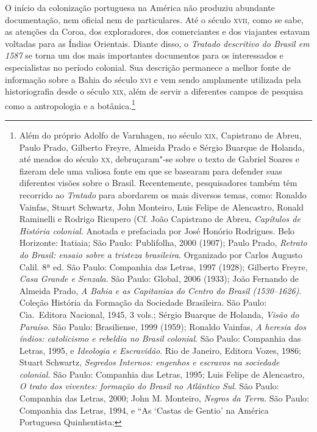 O início da colonização portuguesa na América não produziu abundante
documentação, nem oficial nem de particulares. Até o século \textsc{xvii}, como
se sabe, as atenções da Coroa, dos exploradores, dos comerciantes e dos
viajantes estavam voltadas para as Índias Orientais. Diante disso, o
\textit{Tratado descritivo do Brasil em 1587} se torna um dos mais
importantes documentos para os interessados e especialistas no período
colonial. Sua descrição permanece a melhor fonte de informação
sobre a Bahia do século \textsc{xvi} e vem sendo amplamente utilizada pela
historiografia desde o século \textsc{xix}, além de servir a diferentes campos
de pesquisa como a antropologia e a botânica.\footnote{ Além do próprio
Adolfo de Varnhagen, no século \textsc{xix}, Capistrano de Abreu, Paulo Prado,
Gilberto Freyre, Almeida Prado e Sérgio Buarque de Holanda, até meados
do século \textsc{xx}, debruçaram"-se sobre o texto de Gabriel Soares e fizeram
dele uma valiosa fonte em que se basearam para defender suas diferentes
visões sobre o Brasil. Recentemente, pesquisadores também têm recorrido ao
\textit{Tratado} para abordarem os mais diversos temas, como: Ronaldo
Vainfas, Stuart Schwartz, John Monteiro, Luis Felipe de Alencastro,
Ronald Raminelli e Rodrigo Ricupero (Cf. João Capistrano de Abreu,
\textit{Capítulos de História colonial}. Anotada e prefaciada por José
Honório Rodrigues. Belo Horizonte: Itatiaia; São Paulo: Publifolha,
2000 (1907); Paulo Prado, \textit{Retrato do Brasil: ensaio sobre a
tristeza brasileira}. Organizado por Carlos Augusto Calil. 8ª ed. São
Paulo: Companhia das Letras, 1997 (1928); Gilberto Freyre, \textit{Casa
Grande e Senzala}. São Paulo: Global, 2006 (1933); João Fernando de
Almeida Prado, \textit{A Bahia e as Capitanias do Centro do Brasil
(1530--1626)}. Coleção História da Formação da Sociedade Brasileira.
São Paulo: Cia.~Editora Nacional, 1945, 3 vols.; Sérgio Buarque de
Holanda, \textit{Visão do Paraíso}. São Paulo: Brasiliense, 1999
(1959); Ronaldo Vainfas, \textit{A heresia dos índios: catolicismo e
rebeldia no Brasil colonial}. São Paulo: Companhia das Letras, 1995, e
\textit{Ideologia e Escravidão}. Rio de Janeiro, Editora Vozes, 1986;
Stuart Schwartz, \textit{Segredos Internos: engenhos e escravos na
sociedade colonial.} São Paulo: Companhia das Letras, 1995; Luis Felipe de
Alencastro, \textit{O trato dos viventes: formação do Brasil no
Atlântico Sul}. São Paulo: Companhia das Letras, 2000; John M.
Monteiro, \textit{Negros da Terra}. São Paulo: Companhia das Letras,
1994, e ``As ‘Castas de Gentio’ na América Portuguesa Quinhentista:
}
